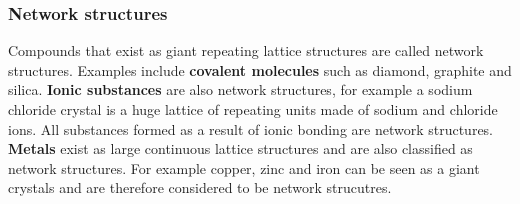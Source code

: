 \subsubsection*{Network structures}
Compounds that exist as giant repeating lattice structures are called network structures. Examples include \textbf{covalent molecules} such as diamond, graphite and silica. \textbf{Ionic substances} are also network structures, for example a sodium chloride crystal is a huge lattice of repeating units made of sodium and chloride ions. All substances formed as a result of ionic bonding are network structures. \textbf{Metals} exist as large continuous lattice structures and are also classified as network structures. For example copper, zinc and iron can be seen as a giant crystals and are therefore considered to be network strucutres.
